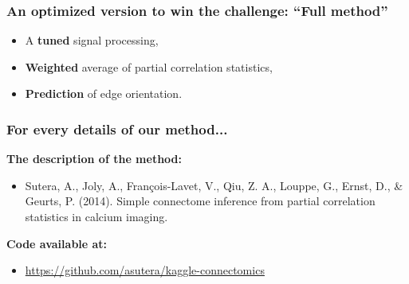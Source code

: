 \documentclass[final]{beamer}
\begin{document}

\begin{frame}
\frametitle{An optimized version to win the challenge: ``Full method''}

\begin{itemize}
\item A \textbf{tuned} signal processing,
\item \textbf{Weighted} average of partial correlation statistics,
\item \textbf{Prediction} of edge orientation.
\end{itemize}

\end{frame}


\begin{frame}
\frametitle{For every details of our method...}

\textbf{The description of the method:}
\begin{itemize}
\item[] Sutera, A., Joly, A., François-Lavet, V., Qiu, Z. A., Louppe, G., Ernst, D., \& Geurts, P. (2014). Simple connectome inference from partial correlation statistics in calcium imaging.\\[7ex]
\end{itemize} 

\textbf{Code available at:}
\begin{itemize}
\item[] \url{https://github.com/asutera/kaggle-connectomics}
\end{itemize}

\end{frame}
\end{document}
